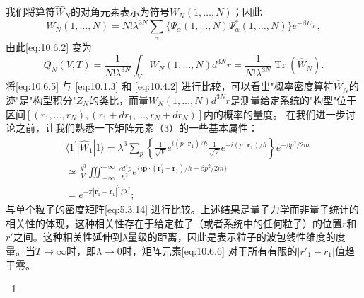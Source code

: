 我们将算符\(\hat{W}_N\)的对角元素表示为符号\(W_N(1,\dots,N)\)；因此
\begin{equation}\tag{10.6.4}\label{eq:10.6.4}
W _ { N } ( 1 , \ldots , N ) = N ! \lambda ^{3 N} \sum _ { \alpha } \{ \Psi _ { \alpha } ( 1 , \ldots , N ) \Psi _ { \alpha } ^{*} ( 1 , \ldots , N ) \} e ^{- \beta E _ { \alpha} } \, ,
\end{equation}
由此\autoref{eq:10.6.2} 变为
\begin{equation}\tag{10.6.5}\label{eq:10.6.5}
Q _ { N } ( V , T ) = \frac { 1 } { N ! \lambda ^{3 N} } \int _ { V } W _ { N } ( 1 , \ldots , N ) d ^{3 N} r = \frac { 1 } { N ! \lambda ^{3 N} } \operatorname { T r } \left( \hat { W } _ { N } \right) .
\end{equation}
将\autoref{eq:10.6.5} 与 \autoref{eq:10.1.3} 和 \autoref{eq:10.4.2} 进行比较，可以看出"概率密度算符\(\hat{W}_N\)的迹"是"构型积分"\(Z_N\)的类比，而量\(W_N(1,\ldots,N)d^{3N}r\)是测量给定系统的"构型"位于区间\([(r_1,\ldots,r_N), (r_1+dr_1,\ldots,r_N+dr_N)]\)内的概率的量度。
在我们进一步讨论之前，让我们熟悉一下矩阵元素（3）的一些基本属性：
\begin{equation}\tag{10.6.6}\label{eq:10.6.6}
\begin{array}{rl} & { \langle 1 ^{\prime} | \hat { W } _ { 1 } | 1 \rangle = \lambda ^{3} \sum _ { p } \left\{ \frac { 1 } { \sqrt { V } } e ^{i ( p \cdot \pmb { r} _ { 1 } ^{\prime} ) / \hbar } \frac { 1 } { \sqrt { V } } e ^{- i ( p \cdot \pmb { r} _ { 1 } ) / \hbar } \right\} e ^{- \beta p ^ { 2} / 2 m } } \\& {  \simeq \frac { \lambda ^{3} } { V } \iiint _ { - \infty } ^{+ \infty} \frac { V d ^{3} p } { h ^{3} } e ^{\{ i \pmb { p} \cdot ( \pmb { r } _ { 1 } ^{\prime} - \pmb { r } _ { 1 } ) / \hbar - \beta p ^{2} / 2 m \} } } \\& {  = e ^{- \pi | \pmb { r} _ { 1 } ^{\prime} - \pmb { r } _ { 1 } | ^{2} / \lambda ^{2} } ; } \end{array}
\end{equation}
与单个粒子的密度矩阵\autoref{eq:5.3.14} 进行比较。上述结果是量子力学而非量子统计的相关性的体现，这种相关性存在于给定粒子（或者系统中的任何粒子）的位置\(r\)和\(r'\)之间。这种相关性延伸到\(\lambda\)量级的距离，因此是表示粒子的波包线性维度的度量。当\(T \to \infty\)时，即\(\lambda \to 0\)时，矩阵元素\autoref{eq:10.6.6} 对于所有有限的\(|r'_1 - r_1|\)值趋于零。
\begin{enumerate}
\def\labelenumi{(\roman{enumi})}
\setcounter{enumi}{1}
\item
\end{enumerate}
